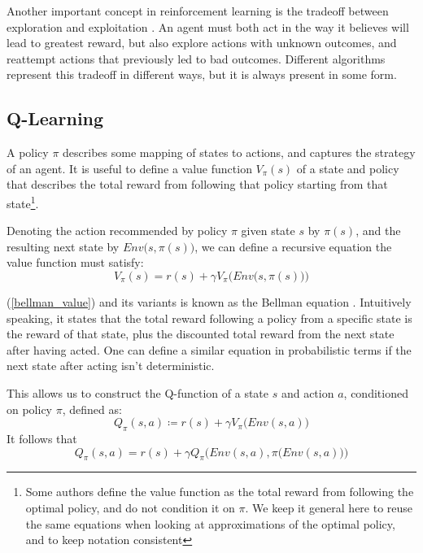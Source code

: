 Another important concept in reinforcement learning is the tradeoff between exploration and exploitation \cite[chapter 2.1]{Sutton}. An agent must both act in the way it believes will lead to greatest reward, but also explore actions with unknown outcomes, and reattempt actions that previously led to bad outcomes. Different algorithms represent this tradeoff in different ways, but it is always present in some form.

\subsection{Q-Learning}
A policy $\pi$ describes some mapping of states to actions, and captures the strategy of an agent. It is useful to define a value function $V_{\pi}(s)$ of a state and policy that describes the total reward from following that policy starting from that state\footnote{Some authors define the value function as the total reward from following the optimal policy, and do not condition it on $\pi$. We keep it general here to reuse the same equations when looking at approximations of the optimal policy, and to keep notation consistent}.

Denoting the action recommended by policy $\pi$ given state $s$ by $\pi(s)$, and the resulting next state by $Env\big(s, \pi(s)\big)$, we can define a recursive equation the value function must satisfy:
\begin{equation}
\label{bellman_value}
    V_{\pi}(s) = r(s) + \gamma V_{\pi} \Big(Env\big(s, \pi(s)\big)\Big)
\end{equation}

(\ref{bellman_value}) and its variants is known as the Bellman equation \cite{BellmanEq}. Intuitively speaking, it states that the total reward following a policy from a specific state is the reward of that state, plus the discounted total reward from the next state after having acted. One can define a similar equation in probabilistic terms if the next state after acting isn't deterministic.


This allows us to construct the Q-function of a state $s$ and action $a$, conditioned on policy $\pi$, defined as:
\begin{equation}
    Q_{\pi}(s, a) \coloneqq r(s) + \gamma V_{\pi}\big(Env(s, a)\big)
\end{equation}
It follows that
\begin{equation}
\label{bellman_q}
    Q_{\pi}(s, a) = r(s) + \gamma Q_{\pi}\Big(Env(s, a), \pi\big(Env(s, a)\big)\Big)
\end{equation}

